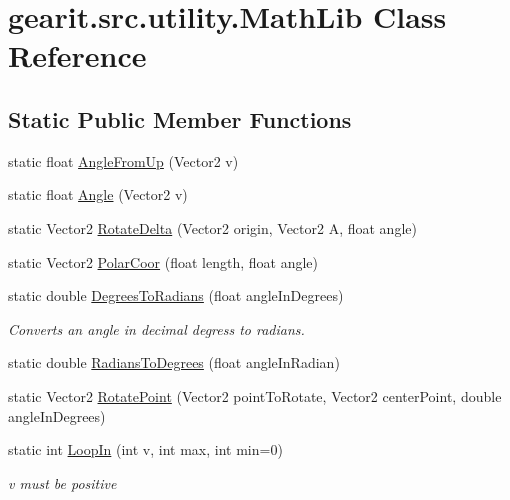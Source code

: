 \hypertarget{classgearit_1_1src_1_1utility_1_1_math_lib}{\section{gearit.\+src.\+utility.\+Math\+Lib Class Reference}
\label{classgearit_1_1src_1_1utility_1_1_math_lib}
}
\subsection*{Static Public Member Functions}
\begin{DoxyCompactItemize}
\item 
static float \hyperlink{classgearit_1_1src_1_1utility_1_1_math_lib_a71b949fd8e152c7236d846b75230a320}{Angle\+From\+Up} (Vector2 v)
\item 
static float \hyperlink{classgearit_1_1src_1_1utility_1_1_math_lib_a96303e42dc1cb93ace27fec65ffa585d}{Angle} (Vector2 v)
\item 
static Vector2 \hyperlink{classgearit_1_1src_1_1utility_1_1_math_lib_a6a034e041ae7f5c8e14229267dddbaa1}{Rotate\+Delta} (Vector2 origin, Vector2 A, float angle)
\item 
static Vector2 \hyperlink{classgearit_1_1src_1_1utility_1_1_math_lib_a30dcdbd4692dfbee45b035ac8c99344f}{Polar\+Coor} (float length, float angle)
\item 
static double \hyperlink{classgearit_1_1src_1_1utility_1_1_math_lib_a64f3667018797b3fd23d0bada20fbfb7}{Degrees\+To\+Radians} (float angle\+In\+Degrees)
\begin{DoxyCompactList}\small\item\em Converts an angle in decimal degress to radians. \end{DoxyCompactList}\item 
static double \hyperlink{classgearit_1_1src_1_1utility_1_1_math_lib_a344179bc54b632600d66e58e881eca0b}{Radians\+To\+Degrees} (float angle\+In\+Radian)
\item 
static Vector2 \hyperlink{classgearit_1_1src_1_1utility_1_1_math_lib_a1acf8ac6d5f1b1b31b216a2b4a2d762a}{Rotate\+Point} (Vector2 point\+To\+Rotate, Vector2 center\+Point, double angle\+In\+Degrees)
\item 
static int \hyperlink{classgearit_1_1src_1_1utility_1_1_math_lib_a20582ef50f12c12e484aba8516b8673b}{Loop\+In} (int v, int max, int min=0)
\begin{DoxyCompactList}\small\item\em v must be positive \end{DoxyCompactList}\end{DoxyCompactItemize}


